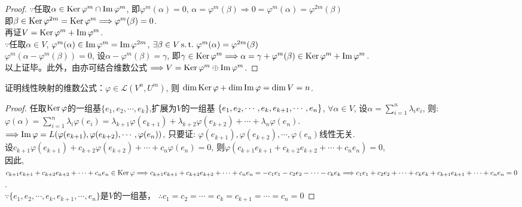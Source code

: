 \begin{proof}
  $\because$任取$\alpha \in \operatorname{Ker}\varphi^m \cap \operatorname{Im}\varphi^m$,
  即$\varphi^m(\alpha)=0$, $\alpha = \varphi^m(\beta) \Longrightarrow
  0 = \varphi^m(\alpha) = \varphi^{2m}(\beta)$\\
  即$\beta \in \operatorname{Ker}\varphi^{2m} = \operatorname{Ker}\varphi^m
  \Longrightarrow \varphi^m(\beta) = 0$. \\
  再证$V = \operatorname{Ker}\varphi^m + \operatorname{Im}\varphi^m$. \\
  $\because$任取$\alpha \in V$,
  $\varphi^m(\alpha) \in \operatorname{Im}\varphi^m = \operatorname{Im}\varphi^{2m}$,
  $\exists \beta \in V \operatorname{s.t.{}} \varphi^m(\alpha) = \varphi^{2m}(\beta)$ \\
  $\varphi^m(\alpha - \varphi^m(\beta))=0$,
  设$\alpha - \varphi^m(\beta) = \gamma$,
  即$\gamma \in \operatorname{Ker}\varphi^m \Longrightarrow
  \alpha = \gamma + \varphi^m(\beta) \in \operatorname{Ker}\varphi^m + \operatorname{Im}\varphi^m$. \\
  以上证毕。此外，由亦可结合维数公式
  $\Longrightarrow V = \operatorname{Ker}\varphi^m \oplus \operatorname{Im}\varphi^m$.
\end{proof}

\begin{example}
  证明线性映射的维数公式：$\varphi \in \mathcal{L}(V^n,U^m)$, 则
  $\operatorname{dim}\operatorname{Ker}\varphi+\operatorname{dim}\operatorname{Im}\varphi=\operatorname{dim} V = n$.
\end{example}

\begin{proof}
  任取$\operatorname{Ker}\varphi$的一组基$\{e_1,e_2,\cdots,e_k\}$,扩展为$V$的一组基
  $\{e_1,e_2,\cdots,e_k,e_{k+1},\cdots,\\e_n\}$,
  $\forall \alpha \in V$,
  设$\alpha=\sum_{i=1}^n\lambda_ie_i$,
  则:\\
  $\varphi(\alpha)=\sum_{i=1}^n\lambda_i\varphi(e_i)
  =\lambda_{k+1}\varphi(e_{k+1})+\lambda_{k+2}\varphi(e_{k+2})+\cdots
  +\lambda_n\varphi(e_n)$.\\
  $\Longrightarrow \operatorname{Im}\varphi =
  L(\varphi(e_{k+1}),\varphi(e_{k+2}),\cdots,\varphi(e_n))$,
  只要证: $\varphi(e_{k+1}),\varphi(e_{k+2}),\cdots,\varphi(e_n)$线性无关.\\
  设$c_{k+1}\varphi(e_{k+1})+c_{k+2}\varphi(e_{k+2})+\cdots+c_n\varphi(e_n)=0$,
  则$\varphi(c_{k+1}e_{k+1}+c_{k+2}e_{k+2}+\cdots+c_ne_n)=0$,\\
  因此, $c_{k+1}e_{k+1}+c_{k+2}e_{k+2}+\cdots+c_ne_n \in \operatorname{Ker}\varphi\\
  \Longrightarrow c_{k+1}e_{k+1}+c_{k+2}e_{k+2}+\cdots+c_ne_n =
  -c_1e_1-c_2e_2-\cdots-c_ke_k\\
  \Longrightarrow c_1e_1+c_2e_2+\cdots+c_ke_k+c_{k+1}e_{k+1}+\cdots+c_ne_n=0$.\\
  $\because \{e_1,e_2,\cdots,e_k,e_{k+1},\cdots,e_n\}$是$V$的一组基，
  $\therefore c_1=c_2=\cdots=c_k=c_{k+1}=\cdots=c_n=0$
\end{proof}

